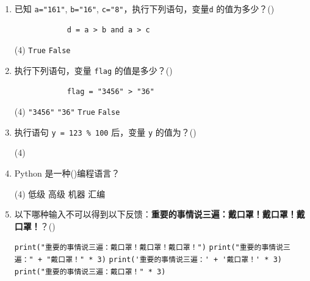 \documentclass[11pt]{ctexart}
\begin{document}
    \begin{enumerate}
        \item 已知 \lstinline{a="161"}, \lstinline{b="16"}, \lstinline{c="8"}，执行下列语句，变量\lstinline{d} 的值为多少？(\qquad)
        \begin{lstlisting}
            d = a > b and a > c
        \end{lstlisting}
        \begin{tasks}(4)
            \task \lstinline{True}
            \task \lstinline{False}
        \end{tasks}
    
        \item 执行下列语句，变量 \lstinline{flag} 的值是多少？(\qquad)
        \begin{lstlisting}
            flag = "3456" > "36"
        \end{lstlisting}
        \begin{tasks}(4)
            \task \lstinline{"3456"}
            \task \lstinline{"36"}
            \task \lstinline{True}
            \task \lstinline{False}
        \end{tasks}

        \item 执行语句 \lstinline{y = 123 % 100} 后，变量 \lstinline{y} 的值为？(\qquad)
        \begin{tasks}(4)
        \end{tasks}
    
        \item Python 是一种(\qquad)编程语言？
        \begin{tasks}(4)
            \task 低级
            \task 高级
            \task 机器
            \task 汇编
        \end{tasks}

        \item 以下哪种输入不可以得到以下反馈：\textbf{重要的事情说三遍：戴口罩！戴口罩！戴口罩！}？(\qquad)
        \begin{tasks}
            \task \lstinline{print("重要的事情说三遍：戴口罩！戴口罩！戴口罩！")}
            \task \lstinline{print("重要的事情说三遍：" + "戴口罩！" * 3)}
            \task \lstinline{print('重要的事情说三遍：' + '戴口罩！' * 3)}
            \task \lstinline{print("重要的事情说三遍：戴口罩！" * 3)}
        \end{tasks}


\end{enumerate}
\end{document}
